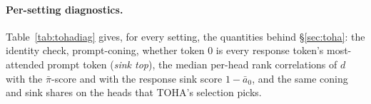 \paragraph{Per-setting diagnostics.} Table~\ref{tab:tohadiag} gives, for every setting, the quantities behind \S\ref{sec:toha}: the identity check, prompt-coning, whether token $0$ is every response token's most-attended prompt token (\emph{sink top}), the median per-head rank correlations of $d$ with the $\bar\pi$-score and with the response sink score $1-\bar a_0$, and the same coning and sink shares on the heads that TOHA's selection picks.
\begin{table}[h]
\centering
\small
\caption{\textbf{TOHA diagnostics.} \emph{viol.}: violations of Proposition~\ref{prop:toha}; \emph{max gap}: largest $|d-\bar\pi\text{-score}|$ on prompt-coned heads; $\rho$: median over heads of the Spearman correlation across examples; \emph{sel.}: over the heads TOHA's Algorithm~1 selects in each training fold (mean number in the last column).}
\label{tab:tohadiag}
\resizebox{\linewidth}{!}{\SinkTableTohaDiag}
\end{table}

\begin{table}[h]
\centering
\small
\caption{\textbf{Our $d$ against the authors' MTop-Div code.} $\Delta$ is the per-head difference; both are divided by $|R|$.}
\label{tab:native}
\SinkTableNative
\end{table}

